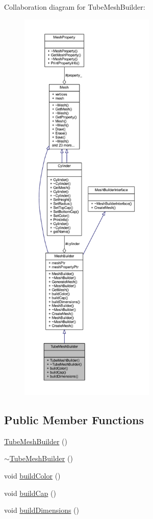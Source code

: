 Collaboration diagram for Tube\+Mesh\+Builder\+:
\nopagebreak
\begin{figure}[H]
\begin{center}
\leavevmode
\includegraphics[height=550pt]{class_tube_mesh_builder__coll__graph}
\end{center}
\end{figure}
\subsection*{Public Member Functions}
\begin{DoxyCompactItemize}
\item 
\mbox{\hyperlink{class_tube_mesh_builder_a9c572de4c460791841bae4aa72b076c8}{Tube\+Mesh\+Builder}} ()
\item 
\mbox{\hyperlink{class_tube_mesh_builder_a5a16887f9378a04355819176a1cd2f98}{$\sim$\+Tube\+Mesh\+Builder}} ()
\item 
void \mbox{\hyperlink{class_tube_mesh_builder_afcdbd454d1ba0c3eed4efb5120783e08}{build\+Color}} ()
\item 
void \mbox{\hyperlink{class_tube_mesh_builder_a7763461e42bd9db6b7d69eb5c7ad4e05}{build\+Cap}} ()
\item 
void \mbox{\hyperlink{class_tube_mesh_builder_a16c5008efeefa80378f86b2a8e116af4}{build\+Dimensions}} ()
\end{DoxyCompactItemize}
